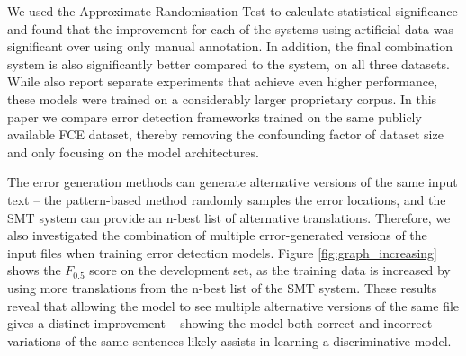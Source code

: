 \documentclass[11pt,letterpaper]{article}
\begin{document}
We used the Approximate Randomisation Test \cite{Noreen1989,Cohen1995} to calculate statistical significance and found that the improvement for each of the systems using artificial data was significant over using only manual annotation. In addition, the final combination system is also significantly better compared to the  system, on all three datasets.
While  also report separate experiments that achieve even higher performance, these models were trained on a considerably larger proprietary corpus.
In this paper we compare error detection frameworks trained on the same publicly available FCE dataset, thereby removing the confounding factor of dataset size and only focusing on the model architectures.

The error generation methods can generate alternative versions of the same input text -- the pattern-based method randomly samples the error locations, and the SMT system can provide an n-best list of alternative translations. Therefore, we also investigated the combination of multiple error-generated versions of the input files when training error detection models.
Figure \ref{fig:graph_increasing} shows the $F_{0.5}$ score on the development set, as the training data is increased by using more translations from the n-best list of the SMT system. 
These results reveal that allowing the model to see multiple alternative versions of the same file gives a distinct improvement -- showing the model both correct and incorrect variations of the same sentences likely assists in learning a discriminative model.





\iffalse
\begin{figure}[t]
	\centering
	\texttt{[image: graph\_artdata\_increasing.png]}
	\caption{$F_{0.5}$ on FCE development set with increasing amounts of artificial data from SMT.}
	\label{fig:graph_increasing}
\end{figure}
\fi
\end{document}
